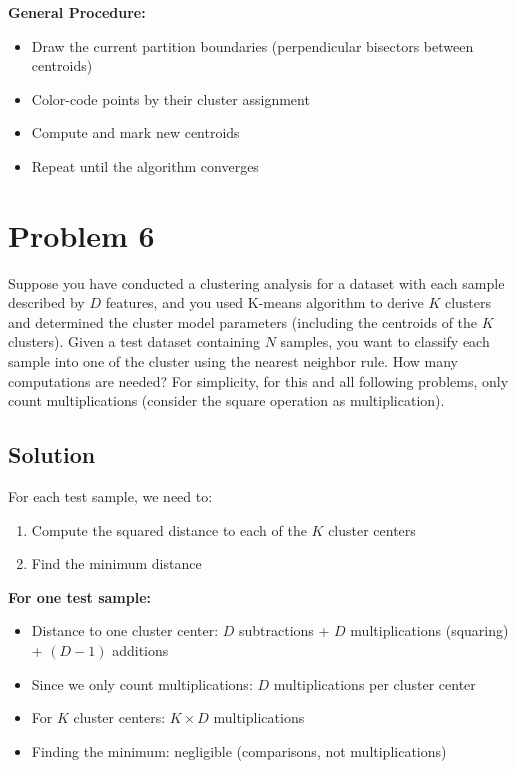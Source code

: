\documentclass[11pt]{article}
\begin{document}
\textbf{General Procedure:}
\begin{itemize}
\item Draw the current partition boundaries (perpendicular bisectors between centroids)
\item Color-code points by their cluster assignment
\item Compute and mark new centroids
\item Repeat until the algorithm converges
\end{itemize}

\newpage

\section*{Problem 6}

Suppose you have conducted a clustering analysis for a dataset with each sample described by $D$ features, and you used K-means algorithm to derive $K$ clusters and determined the cluster model parameters (including the centroids of the $K$ clusters). Given a test dataset containing $N$ samples, you want to classify each sample into one of the cluster using the nearest neighbor rule. How many computations are needed? For simplicity, for this and all following problems, only count multiplications (consider the square operation as multiplication).

\subsection*{Solution}

For each test sample, we need to:
\begin{enumerate}
\item Compute the squared distance to each of the $K$ cluster centers
\item Find the minimum distance
\end{enumerate}

\textbf{For one test sample:}
\begin{itemize}
\item Distance to one cluster center: $D$ subtractions + $D$ multiplications (squaring) + $(D-1)$ additions
\item Since we only count multiplications: $D$ multiplications per cluster center
\item For $K$ cluster centers: $K \times D$ multiplications
\item Finding the minimum: negligible (comparisons, not multiplications)
\end{itemize}
\end{document}

